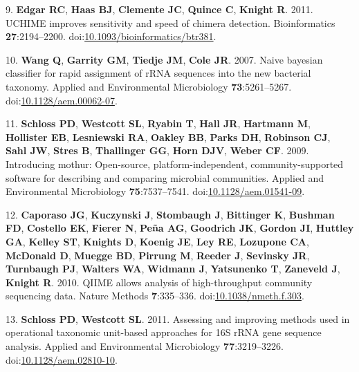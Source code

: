\documentclass[11pt,]{article}
\begin{document}
\hypertarget{ref-Edgar2011}{}
9. \textbf{Edgar RC}, \textbf{Haas BJ}, \textbf{Clemente JC},
\textbf{Quince C}, \textbf{Knight R}. 2011. UCHIME improves sensitivity
and speed of chimera detection. Bioinformatics \textbf{27}:2194--2200.
doi:\href{https://doi.org/10.1093/bioinformatics/btr381}{10.1093/bioinformatics/btr381}.

\hypertarget{ref-Wang2007}{}
10. \textbf{Wang Q}, \textbf{Garrity GM}, \textbf{Tiedje JM},
\textbf{Cole JR}. 2007. Naive bayesian classifier for rapid assignment
of rRNA sequences into the new bacterial taxonomy. Applied and
Environmental Microbiology \textbf{73}:5261--5267.
doi:\href{https://doi.org/10.1128/aem.00062-07}{10.1128/aem.00062-07}.

\hypertarget{ref-Schloss2009b}{}
11. \textbf{Schloss PD}, \textbf{Westcott SL}, \textbf{Ryabin T},
\textbf{Hall JR}, \textbf{Hartmann M}, \textbf{Hollister EB},
\textbf{Lesniewski RA}, \textbf{Oakley BB}, \textbf{Parks DH},
\textbf{Robinson CJ}, \textbf{Sahl JW}, \textbf{Stres B},
\textbf{Thallinger GG}, \textbf{Horn DJV}, \textbf{Weber CF}. 2009.
Introducing mothur: Open-source, platform-independent,
community-supported software for describing and comparing microbial
communities. Applied and Environmental Microbiology
\textbf{75}:7537--7541.
doi:\href{https://doi.org/10.1128/aem.01541-09}{10.1128/aem.01541-09}.

\hypertarget{ref-Caporaso2010}{}
12. \textbf{Caporaso JG}, \textbf{Kuczynski J}, \textbf{Stombaugh J},
\textbf{Bittinger K}, \textbf{Bushman FD}, \textbf{Costello EK},
\textbf{Fierer N}, \textbf{Peña AG}, \textbf{Goodrich JK},
\textbf{Gordon JI}, \textbf{Huttley GA}, \textbf{Kelley ST},
\textbf{Knights D}, \textbf{Koenig JE}, \textbf{Ley RE},
\textbf{Lozupone CA}, \textbf{McDonald D}, \textbf{Muegge BD},
\textbf{Pirrung M}, \textbf{Reeder J}, \textbf{Sevinsky JR},
\textbf{Turnbaugh PJ}, \textbf{Walters WA}, \textbf{Widmann J},
\textbf{Yatsunenko T}, \textbf{Zaneveld J}, \textbf{Knight R}. 2010.
QIIME allows analysis of high-throughput community sequencing data.
Nature Methods \textbf{7}:335--336.
doi:\href{https://doi.org/10.1038/nmeth.f.303}{10.1038/nmeth.f.303}.

\hypertarget{ref-Schloss2011}{}
13. \textbf{Schloss PD}, \textbf{Westcott SL}. 2011. Assessing and
improving methods used in operational taxonomic unit-based approaches
for 16S rRNA gene sequence analysis. Applied and Environmental
Microbiology \textbf{77}:3219--3226.
doi:\href{https://doi.org/10.1128/aem.02810-10}{10.1128/aem.02810-10}.
\end{document}
